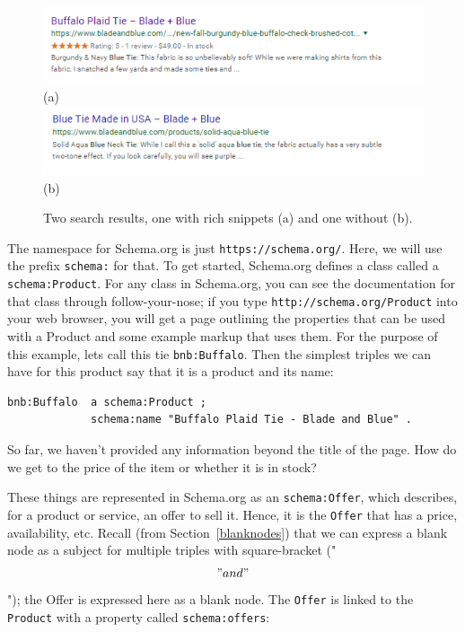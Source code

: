 \begin{figure}
    \centering
    \includegraphics{SWWOv3/media/ch4/WithRichSnippet.png}
    (a)
    \includegraphics{SWWOv3/media/ch4/WithoutRichSnippet.png}
    (b)
    \caption{Two search results, one with rich snippets (a) and one without (b). }
    \label{fig:ch4.RSReprise}
\end{figure}


The namespace for Schema.org is just \texttt{https://schema.org/}. Here, we will 
use the prefix \texttt{schema:} for that. To get started, Schema.org defines a class called 
a \texttt{schema:Product}.  For any class in Schema.org, you can see the 
documentation for that class through follow-your-nose; if you type 
\texttt{http://schema.org/Product} into your web browser, you will get a page outlining
the properties that can be used with a Product and some example markup that uses them. 
For the purpose of this example, lets call this tie \texttt{bnb:Buffalo}.  Then 
the simplest triples we can have for this product say that it is a product and its 
name:

\begin{lstlisting}
bnb:Buffalo  a schema:Product ;
             schema:name "Buffalo Plaid Tie - Blade and Blue" .
\end{lstlisting}

So far, we haven't provided any information beyond the title of the page.  How do we get
to the price of the item or whether it is in stock? 

These things are represented in Schema.org as an \texttt{schema:Offer}, which describes, 
for a product or service, an offer to sell it.  Hence, it is the \texttt{Offer} that has
a price, availability, etc.  Recall (from Section~\ref{blanknodes}) that we can express a blank node as a subject for multiple
triples with  square-bracket ("\[" and "\]"); the Offer is expressed here as a blank node. 
The \texttt{Offer} is linked to the \texttt{Product} with a 
property called \texttt{schema:offers}:

